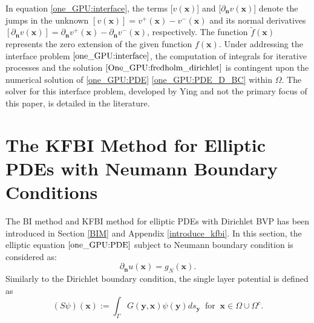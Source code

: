 \documentclass{article}
\begin{document}
In equation \eqref{one_GPU:interface}, the terms [$v(\mathbf{x})$] and [$\partial_{\mathbf{n}}v(\mathbf{x})$] denote the jumps in the unknown $[v(\mathbf{x})] = v^{+}(\mathbf{x}) - v^{-}(\mathbf{x})$ and its normal derivatives $[\partial_{\mathbf{n}}v(\mathbf{x})] = \partial_{\mathbf{n}}v^{+}(\mathbf{x}) - \partial_{\mathbf{n}}v^{-}(\mathbf{x})$, respectively. The function $\tilde{f}(\mathbf{x})$ represents the zero extension of the given function $f(\mathbf{x})$. Under addressing the interface problem $\eqref{one_GPU:interface}$, the computation of integrals for iterative processes and the solution $\eqref{One_GPU:fredholm_dirichlet}$ is contingent upon the numerical solution of \eqref{one_GPU:PDE} \eqref{one_GPU:PDE_D_BC} within $\Omega$. The solver for this interface problem, developed by Ying  and not the primary focus of this paper, is detailed in the literature\cite{ying2007kernel}. 

\section{The KFBI Method for Elliptic PDEs with Neumann Boundary Conditions} \label{appen::neumann::condition}
The BI method and KFBI method for elliptic PDEs with Dirichlet BVP has been introduced in Section \ref{BIM} and Appendix \ref{introduce_kfbi}. In this section, the elliptic equation $\eqref{one_GPU:PDE}$ subject to Neumann boundary condition is considered as:
\begin{equation}
    \partial_{\mathbf{n}}u(\mathbf{x}) = g_{N}(\mathbf{x}). \label{Neumann}
\end{equation}
Similarly to the Dirichlet boundary condition, the single layer potential is defined as
\begin{equation}
    (S\psi)(\mathbf{x}) := \int_{\Gamma} G(\mathbf{y}, \mathbf{x}) \psi(\mathbf{y}) d s_{\mathbf{y}} ~\text { for } ~\mathbf{x} \in \Omega \cup \Omega^{c}. \label{single}
\end{equation}
\end{document}
